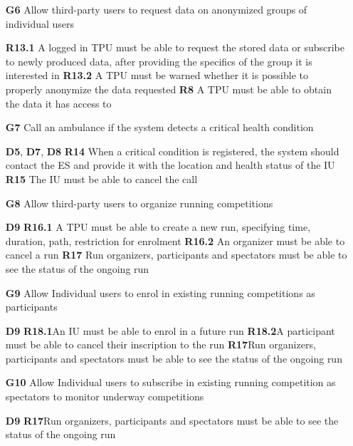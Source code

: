 \begin{itemize}
\item [\textbf{G6}] Allow third-party users to request data on anonymized groups of individual users

\subitem \textbf{R13.1} A logged in TPU must be able to request the stored data or subscribe to newly produced data, after providing the specifics of the group it is interested in
\subitem \textbf{R13.2} A TPU must be warned whether it is possible to properly anonymize the data requested
\subitem \textbf{R8} A TPU must be able to obtain the data it has access to 

\item [\textbf{G7}] Call an ambulance if the system detects a critical health condition

\subitem \textbf{D5}, \textbf{D7}, \textbf{D8}
\subitem \textbf{R14} When a critical condition is registered, the system should contact the ES and provide it with the location and health status of the IU
\subitem \textbf{R15} The IU must be able to cancel the call

\item [\textbf{G8}] Allow third-party users to organize running competitions

\subitem \textbf{D9}
\subitem \textbf{R16.1} A TPU must be able to create a new run, specifying time, duration, path, restriction for enrolment
\subitem \textbf{R16.2} An organizer must be able to cancel a run 
\subitem \textbf{R17} Run organizers, participants and spectators must be able to see the status of the ongoing run

\item [\textbf{G9}] Allow Individual users to enrol in existing running competitions as participants

\subitem \textbf{D9}
\subitem \textbf{R18.1}An IU must be able to enrol in a future run
\subitem \textbf{R18.2}A participant must be able to cancel their inscription to the run 
\subitem \textbf{R17}Run organizers, participants and spectators must be able to see the status of the ongoing run

\item [\textbf{G10}] Allow Individual users to subscribe in existing running competition as spectators to monitor underway competitions

\subitem \textbf{D9} 
\subitem \textbf{R17}Run organizers, participants and spectators must be able to see the status of the ongoing run
\end{itemize}
